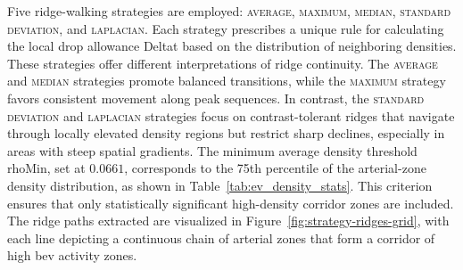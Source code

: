Five ridge-walking strategies are employed: \textsc{average}, \textsc{maximum}, \textsc{median}, \textsc{standard deviation}, and \textsc{laplacian}. Each strategy prescribes a unique rule for calculating the local drop allowance \gls{Deltat} based on the distribution of neighboring densities. These strategies offer different interpretations of ridge continuity. The \textsc{average} and \textsc{median} strategies promote balanced transitions, while the \textsc{maximum} strategy favors consistent movement along peak sequences. In contrast, the \textsc{standard deviation} and \textsc{laplacian} strategies focus on contrast-tolerant ridges that navigate through locally elevated density regions but restrict sharp declines, especially in areas with steep spatial gradients.
The minimum average density threshold \gls{rhoMin}, set at $0.0661$, corresponds to the 75th percentile of the arterial-zone density distribution, as shown in Table~\ref{tab:ev_density_stats}. This criterion ensures that only statistically significant high-density corridor zones are included.
The ridge paths extracted are visualized in Figure~\ref{fig:strategy-ridges-grid}, with each line depicting a continuous chain of arterial zones that form a corridor of high \gls{bev} activity zones.
